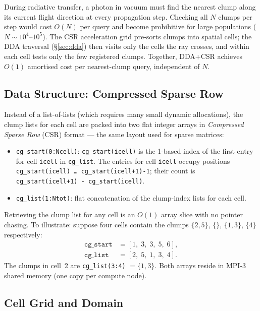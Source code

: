 \documentclass[english,a4paper]{my_memo}
\begin{document}
During radiative transfer, a photon in vacuum must find the nearest clump
along its current flight direction at every propagation step.  Checking all
$N$ clumps per step would cost $O(N)$ per query and become prohibitive for
large populations ($N \sim 10^4$--$10^5$).  The CSR acceleration grid
pre-sorts clumps into spatial cells; the DDA traversal (\S\ref{sec:dda})
then visits only the cells the ray crosses, and within each cell tests only
the few registered clumps.  Together, DDA+CSR achieves $O(1)$ amortised cost
per nearest-clump query, independent of $N$.

\subsection{Data Structure: Compressed Sparse Row}

Instead of a list-of-lists (which requires many small dynamic allocations),
the clump lists for each cell are packed into two flat integer arrays in
\emph{Compressed Sparse Row} (CSR) format --- the same layout used for
sparse matrices:
\begin{sloppypar}
\begin{itemize}
  \item \texttt{cg\_start(0:Ncell)}: \texttt{cg\_start(icell)} is the
        1-based index of the first entry for cell \texttt{icell} in
        \texttt{cg\_list}.  The entries for cell \texttt{icell} occupy
        positions \texttt{cg\_start(icell) \ldots{} cg\_start(icell+1)-1};
        their count is \texttt{cg\_start(icell+1) - cg\_start(icell)}.
  \item \texttt{cg\_list(1:Ntot)}: flat concatenation of the clump-index lists for each cell.
\end{itemize}
\end{sloppypar}

Retrieving the clump list for any cell is an $O(1)$ array slice with no
pointer chasing.  To illustrate: suppose four cells contain the clumps
$\{2,5\}$, $\{\}$, $\{1,3\}$, $\{4\}$ respectively:
\begin{align*}
  \texttt{cg\_start} &= [1,\;3,\;3,\;5,\;6], \\
  \texttt{cg\_list}  &= [2,\;5,\;1,\;3,\;4].
\end{align*}
The clumps in cell~2 are \texttt{cg\_list(3:4)} $= \{1,3\}$.
Both arrays reside in MPI-3 shared memory (one copy per compute node).

\subsection{Cell Grid and Domain}
\label{sec:csr_grid}
\end{document}
